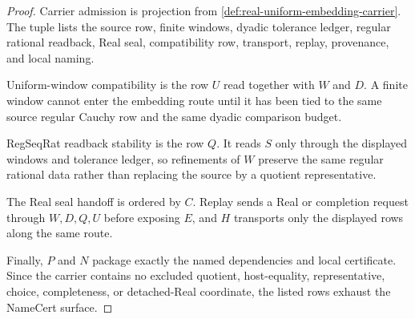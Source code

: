 \begin{proof}
Carrier admission is projection from \autoref{def:real-uniform-embedding-carrier}. The tuple lists the source row, finite windows, dyadic tolerance ledger, regular rational readback, Real seal, compatibility row, transport, replay, provenance, and local naming.

Uniform-window compatibility is the row $U$ read together with $W$ and $D$. A finite window cannot enter the embedding route until it has been tied to the same source regular Cauchy row and the same dyadic comparison budget.

RegSeqRat readback stability is the row $Q$. It reads $S$ only through the displayed windows and tolerance ledger, so refinements of $W$ preserve the same regular rational data rather than replacing the source by a quotient representative.

The Real seal handoff is ordered by $C$. Replay sends a Real or completion request through $W,D,Q,U$ before exposing $E$, and $H$ transports only the displayed rows along the same route.

Finally, $P$ and $N$ package exactly the named dependencies and local certificate. Since the carrier contains no excluded quotient, host-equality, representative, choice, completeness, or detached-Real coordinate, the listed rows exhaust the NameCert surface.
\end{proof}

